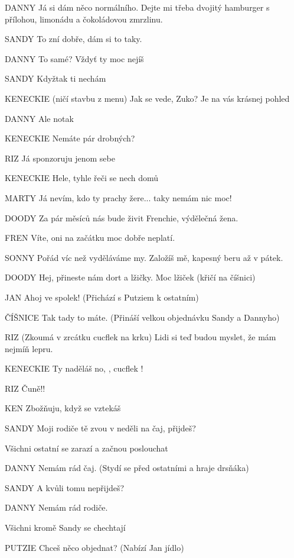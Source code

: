 DANNY        Já si dám něco normálního. Dejte mi třeba dvojitý hamburger s přílohou,         limonádu a čokoládovou zmrzlinu. 

SANDY        To zní dobře, dám si to taky. 

DANNY         To samé? Vždyť ty moc nejíš 

SANDY         Kdyžtak ti nechám 

KENECKIE        (ničí stavbu z menu) Jak se vede, Zuko? Je na vás krásnej pohled 

DANNY         Ale notak

KENECKIE        Nemáte pár drobných?

RIZ                Já sponzoruju jenom sebe 

KENECKIE        Hele, tyhle řeči se nech domů 

MARTY        Já nevím, kdo ty prachy žere... taky nemám nic moc! 

DOODY        Za pár měsíců nás bude živit Frenchie, výdělečná žena. 

FREN        Víte, oni na začátku moc dobře neplatí. 

SONNY        Pořád víc než vyděláváme my. Založíš mě, kapesný beru až v pátek. 

DOODY         Hej, přineste nám dort a  lžičky.  Moc lžiček (křičí na číšnici) 

JAN         Ahoj ve spolek! (Přichází s Putziem k ostatním) 

ČÍŠNICE        Tak tady to máte. (Přináší velkou objednávku Sandy a Dannyho) 

RIZ         (Zkoumá v zrcátku cucflek na krku) Lidi si teď budou myslet, že mám         nejmíň lepru. 

KENECKIE        Ty naděláš no, , cucflek ! 

RIZ                Čuně!! 

KEN        Zbožňuju, když se vztekáš 

SANDY        Moji rodiče tě zvou v neděli na čaj, přijdeš? 

Všichni ostatní se zarazí a začnou poslouchat 

DANNY        Nemám rád čaj. (Stydí se před ostatními a hraje drsňáka) 

SANDY         A kvůli tomu nepřijdeš? 

DANNY        Nemám rád rodiče. 

Všichni kromě Sandy se chechtají 

PUTZIE        Chceš něco objednat? (Nabízí Jan jídlo) 

